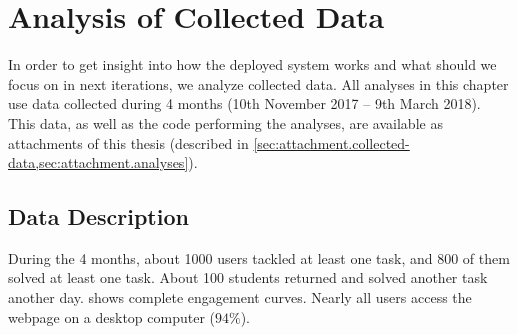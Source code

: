 \chapter{Analysis of Collected Data}
\label{chap:analysis}


In order to get insight into how the deployed system works
and what should we focus on in next iterations,
we analyze collected data.
All analyses in this chapter use data collected  %
during 4 months (10th November 2017 -- 9th March 2018).
This data, as well as the code performing the analyses, are available
as attachments of this thesis
(described in \cref{sec:attachment.collected-data,sec:attachment.analyses}).


\section{Data Description}

During the 4 months, about 1000 users tackled at least one task,
and 800 of them solved at least one task.
About 100 students returned and solved another task another day.
 shows complete engagement curves.
Nearly all users access the webpage on a desktop computer ($94\%$).

